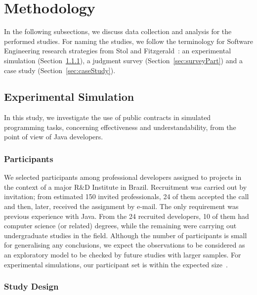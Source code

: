 \section{Methodology}
\label{sec:researchDesign}

In the following subsections, we discuss data collection and analysis for the performed studies. For naming the studies, we follow the terminology for Software Engineering research strategies from Stol and Fitzgerald~\cite{Stol2015}: an experimental simulation (Section~\ref{sec:expPart}), a judgment survey (Section~\ref{sec:surveyPart}) and a case study (Section~\ref{sec:caseStudy}).

\subsection{Experimental Simulation}
\label{sec:experiment}

In this study, we investigate the use of
public contracts in simulated programming tasks, concerning effectiveness and understandability, from the point of view of Java developers.

\subsubsection{Participants}
\label{sec:expPart}

We selected participants among professional developers assigned to projects in the context of a major R\&D Institute in Brazil. Recruitment was carried out by invitation; from estimated 150 invited professionals, 24 of them accepted the call and then, later, received the assignment by e-mail. The only requirement was previous experience with Java. From the 24 recruited developers, 10 of them had computer science (or related) degrees, while the remaining were carrying out undergraduate studies in the field. 
Although the number of participants is small for generalising any conclusions, we expect the observations to be considered as an exploratory model to be checked by future studies with larger samples. For experimental simulations, our participant set is within the expected size~\cite{Stol2015}.


\subsubsection{Study Design}
\label{sec:studyDesign}

